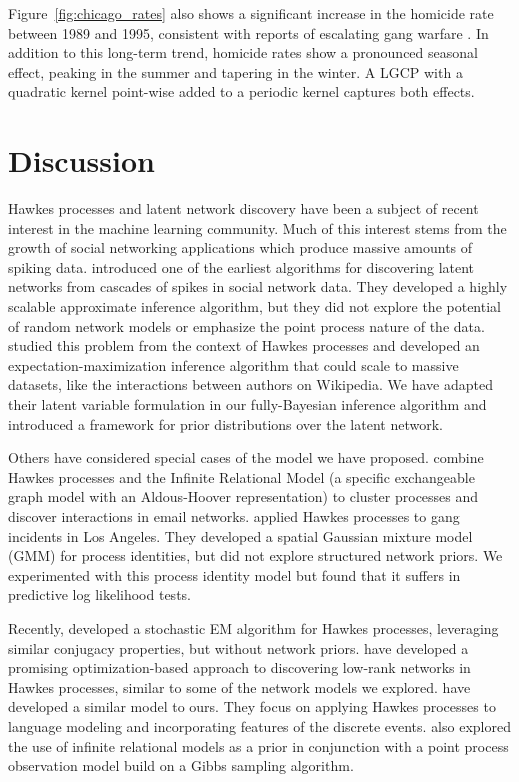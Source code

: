 Figure~\ref{fig:chicago_rates} also shows a significant increase in
the homicide rate between 1989 and 1995, consistent with reports of
escalating gang warfare \citep{Block-1993}. In addition to this
long-term trend, homicide rates show a pronounced seasonal effect,
peaking in the summer and tapering in the winter. A LGCP with a
quadratic kernel point-wise added to a periodic kernel captures both
effects.

\section{Discussion}
Hawkes processes and latent network discovery have been a subject
of recent interest in the machine learning community. Much of this
interest stems from the growth of social networking applications
which produce massive amounts of spiking data. 
\citet{Gomez-2010} introduced one of the earliest algorithms for
discovering latent networks from cascades of spikes in social network
data. They developed a
highly scalable approximate inference algorithm, but they did not
explore the potential of random network models or emphasize the point
process nature of the data.
\citet{Simma-2010} studied this problem from the context of Hawkes
processes and developed an expectation-maximization inference
algorithm that could scale to massive datasets, like the interactions
between authors on Wikipedia.
We have adapted their latent variable formulation in our
fully-Bayesian inference algorithm and introduced a framework for
prior distributions over the latent network.

Others have considered special cases of the model we have
proposed. \citet{Blundell-2012} combine Hawkes processes and the
Infinite Relational Model (a specific exchangeable graph model with an
Aldous-Hoover representation) to cluster processes and discover
interactions in email networks. \citet{Cho-2013} applied Hawkes processes to gang
incidents in Los Angeles. They developed a spatial Gaussian mixture
model (GMM) for process identities, but did not explore structured
network priors. We experimented with this process identity model but
found that it suffers in predictive log likelihood tests.

Recently, \citet{Iwata-2013} developed a stochastic EM algorithm for
Hawkes processes, leveraging similar conjugacy properties, but without
network priors. \citet{Zhou-2013} have developed a promising
optimization-based approach to discovering low-rank networks in Hawkes
processes, similar to some of the network models we explored.
\citet{Guo-2014} have developed a similar model to ours. They focus on
applying Hawkes processes to language modeling and incorporating
features of the discrete events. \citet{Dubois-2013} also explored the
use of infinite relational models as a prior in conjunction with a
point process observation model build on a Gibbs sampling algorithm.


